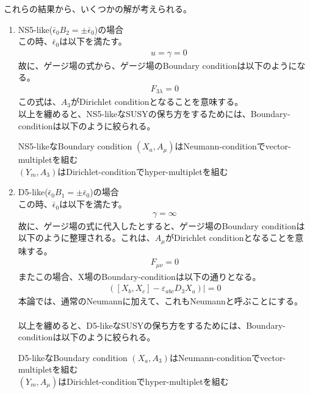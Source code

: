 \documentclass[dvipdfmx,a4paper,10.5pt]{article}
\numberwithin{equation}{section}
\begin{document}
これらの結果から、いくつかの解が考えられる。
\begin{enumerate}
    \item NS5-like($ \bar{\epsilon}_{0}B_{2}=\pm\bar{\epsilon}_{0}$)の場合\\
    この時、$\bar{\epsilon}_{0}$は以下を満たす。
    \begin{equation}\begin{split}
       \quad u=\gamma=0
    \end{split} \end{equation}
    故に、ゲージ場の式から、ゲージ場のBoundary conditionは以下のようになる。
    \begin{equation}\begin{split}
        F_{3\lambda}=0
    \end{split} \end{equation}
    この式は、$A_{3}$がDirichlet conditionとなることを意味する。\\
    以上を纏めると、NS5-likeなSUSYの保ち方をするためには、Boundary-conditionは以下のように絞られる。
    \begin{resultbox}{NS5-likeなBoundary condition}
        $(X_{a},A_{\mu})$はNeumann-conditionでvector-multipletを組む\\
        $(Y_{m},A_{3})$はDirichlet-conditionでhyper-multipletを組む
    \end{resultbox}
     \item D5-like($ \bar{\epsilon}_{0}B_{1}=\pm\bar{\epsilon}_{0}$)の場合\\
    この時、$\bar{\epsilon}_{0}$は以下を満たす。
    \begin{equation}\begin{split}
      \gamma=\infty
    \end{split} \end{equation}
    故に、ゲージ場の式に代入したとすると、ゲージ場のBoundary conditionは以下のように整理される。これは、$A_{\mu}$がDirichlet conditionとなることを意味する。
    \begin{equation}\begin{split}
        F_{\mu\nu}=0
    \end{split} \end{equation}
    またこの場合、X場のBoundary-conditionは以下の通りとなる。
    \begin{align*}
        ([X_{b},X_{c}]-\varepsilon_{abc}D_{3}X_{a})|=0
    \end{align*}
    本論では、通常のNeumannに加えて、これもNeumannと呼ぶことにする。\\
    \\
    以上を纏めると、D5-likeなSUSYの保ち方をするためには、Boundary-conditionは以下のように絞られる。
    \begin{resultbox}{D5-likeなBoundary condition}
        $(X_{a},A_{3})$はNeumann-conditionでvector-multipletを組む\\
        $(Y_{m},A_{\mu})$はDirichlet-conditionでhyper-multipletを組む
    \end{resultbox}
\end{enumerate}
\end{document}
